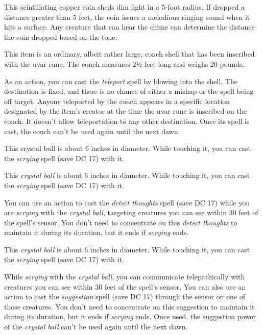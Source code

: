 \documentclass[10pt,a4paper,twoside,bg=print,twocolumn,openany,nodeprecatedcode]{dndbook}
\begin{document}
This scintillating copper coin sheds dim light in a 5-foot radius. If dropped a distance greater than 5 feet, the coin issues a melodious ringing sound when it hits a surface. Any creature that can hear the chime can determine the distance the coin dropped based on the tone.

This item is an ordinary, albeit rather large, conch shell that has been inscribed with the uvar rune. The conch measures 2½ feet long and weighs 20 pounds.

As an action, you can cast the \textit{teleport} spell by blowing into the shell. The destination is fixed, and there is no chance of either a mishap or the spell being off target. Anyone teleported by the conch appears in a specific location designated by the item's creator at the time the uvar rune is inscribed on the conch. It doesn't allow teleportation to any other destination. Once its spell is cast, the conch can't be used again until the next dawn.

This crystal ball is about 6 inches in diameter. While touching it, you can cast the \textit{scrying} spell (save DC 17) with it.

This \textit{crystal ball} is about 6 inches in diameter. While touching it, you can cast the \textit{scrying} spell (save DC 17) with it.

You can use an action to cast the \textit{detect thoughts} spell (save DC 17) while you are \textit{scrying} with the \textit{crystal ball}, targeting creatures you can see within 30 feet of the spell's sensor. You don't need to concentrate on this \textit{detect thoughts} to maintain it during its duration, but it ends if \textit{scrying} ends.

This \textit{crystal ball} is about 6 inches in diameter. While touching it, you can cast the \textit{scrying} spell (save DC 17) with it.

While \textit{scrying} with the \textit{crystal ball}, you can communicate telepathically with creatures you can see within 30 feet of the spell's sensor. You can also use an action to cast the \textit{suggestion} spell (save DC 17) through the sensor on one of those creatures. You don't need to concentrate on this suggestion to maintain it during its duration, but it ends if \textit{scrying} ends. Once used, the suggestion power of the \textit{crystal ball} can't be used again until the next dawn.
\end{document}
